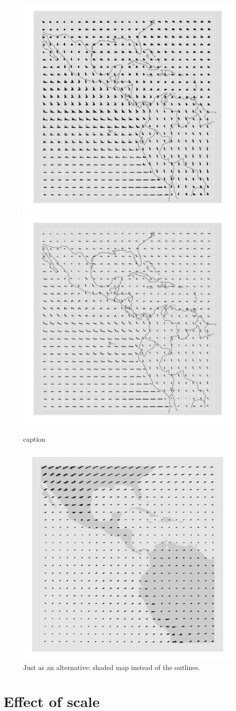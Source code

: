 \documentclass[oneside]{article}
\begin{document}
\begin{figure}[htbp]
  \centering
   \includegraphics[width=0.5\linewidth]{clouds}%
   \includegraphics[width=0.5\linewidth]{clouds-smooth}
  \caption{caption}
  \label{fig:cloud}
\end{figure}

\begin{figure}[htbp]
  \centering
    \includegraphics[width=0.5\linewidth]{clouds-heike}%
  \caption{Just as an alternative: shaded map instead of the outlines. }
  \label{fig:cloud-alt}
\end{figure}

\section{Effect of scale}
\end{document}
